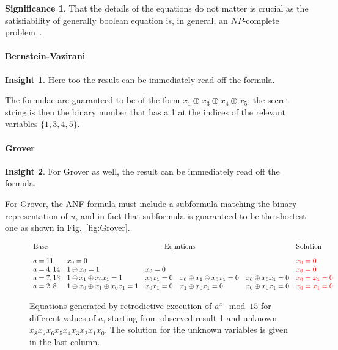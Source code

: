 \documentclass[sigplan,review]{acmart}
\newcommand{\red}[1]{{\color{red}{#1}}}
\theoremstyle{definition}
\newtheorem*{insight}{Insight}
\newtheorem*{signif}{Significance}
\begin{document}
\begin{signif}
That the details of the equations do not matter is crucial as the
satisfiability of generally boolean equation is, in
general, an $\mathit{NP}$-complete
problem~\cite{4640789,Karp1972,10.1145/800157.805047}. 
\end{signif}

\paragraph*{Bernstein-Vazirani}

\begin{insight}
  Here too the result can be immediately read off the formula.
\end{insight}

The formulae are guaranteed to be of the form
$x_1 \oplus x_3 \oplus x_4 \oplus x_5$; the secret string is then the
binary number that has a 1 at the indices of the relevant variables
$\{ 1,3,4,5 \}$. 

\paragraph*{Grover}

\begin{insight}
  For Grover as well, the result can be immediately read off the formula.
\end{insight}

For Grover, the ANF formula must include a
subformula matching the binary representation of $u$, and in fact that
subformula is guaranteed to be the shortest one as shown in Fig.~\ref{fig:Grover}.

\begin{figure*}
\[\begin{array}{l@{\quad}lllll}
\textrm{Base} & \multicolumn{4}{c}{\textrm{Equations}} & \textrm{Solution} \\[2ex]
a=11 & x_0 = 0 &&&& \red{x_0 = 0} \\
a=4,14 & 1 \oplus x_0 = 1 & x_0 = 0 &&
  & \red{x_0 = 0} \\
a=7,13 & 1 \oplus x_1 \oplus x_0x_1 = 1 & x_0x_1 = 0 & x_0 \oplus x_1 \oplus x_0x_1 = 0 &  x_0 \oplus x_0x_1 = 0 & \red{x_0=x_1=0} \\
a=2,8 & 1 \oplus x_0 \oplus x_1 \oplus x_0x_1 = 1 & x_0x_1 = 0 & x_1 \oplus x_0x_1 = 0 & x_0 \oplus x_0x_1 = 0  & \red{x_0=x_1=0}
\end{array}\]
\caption{\label{fig:shor-eqs}Equations generated by retrodictive
  execution of $a^x \mod{15}$ for different values of $a$, starting
  from observed result 1 and unknown
  $x_8x_7x_6x_5x_4x_3x_2x_1x_0$. The solution for the unknown
  variables is given in the last column.}
\end{figure*}
\end{document}
